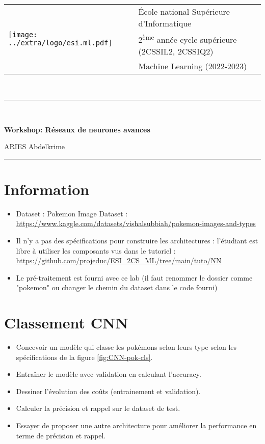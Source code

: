 \documentclass[11pt, a4paper]{article}
\begin{document}

\noindent
\begin{tabular}{ll}
\multirow{3}{*}{\texttt{[image: ../extra/logo/esi.ml.pdf]}} & \'Ecole national Supérieure d'Informatique\\
& 2\textsuperscript{ème} année cycle supérieure (2CSSIL2, 2CSSIQ2)\\
& Machine Learning (2022-2023)
\end{tabular}\\[.25cm]
\noindent\rule{\textwidth}{1pt}\\%
\begin{center}
{\LARGE \textbf{Workshop: Réseaux de neurones avances}}
\begin{flushright}
	ARIES Abdelkrime
\end{flushright}
\end{center}
\noindent\rule{\textwidth}{1pt}

\section*{Information}

\begin{itemize}
	\item Dataset : Pokemon Image Dataset : {\scriptsize\url{https://www.kaggle.com/datasets/vishalsubbiah/pokemon-images-and-types}}
	\item Il n'y a pas des spécifications pour construire les architectures : l'étudiant est libre à utiliser les composants vus dans le tutoriel : {\scriptsize \url{https://github.com/projeduc/ESI_2CS_ML/tree/main/tuto/NN}}
	\item Le pré-traitement est fourni avec ce lab (il faut renommer le dossier comme "pokemon" ou changer le chemin du dataset dans le code fourni)
\end{itemize}

\section{Classement CNN}

\begin{itemize}
	\item Concevoir un modèle qui classe les pokémons selon leurs type selon les spécifications de la figure \ref{fig:CNN-pok-cls}.
	\item Entraîner le modèle avec validation en calculant l'accuracy.
	\item Dessiner l'évolution des coûts (entrainement et validation).
	\item Calculer la précision et rappel sur le dataset de test.
	\item Essayer de proposer une autre architecture pour améliorer la performance en terme de précision et rappel.
\end{itemize}
\end{document}
